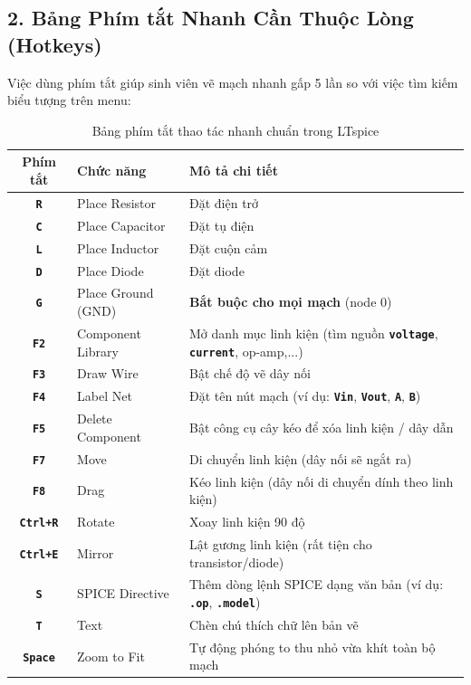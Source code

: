 \documentclass[11pt,a4paper]{article}
\newcommand{\code}[1]{\texttt{\color{navy}\textbf{#1}}}
\newcommand{\key}[1]{\colorbox{gray!20}{\texttt{\textbf{#1}}}}
\begin{document}
\subsection{2. Bảng Phím tắt Nhanh Cần Thuộc Lòng (Hotkeys)}
Việc dùng phím tắt giúp sinh viên vẽ mạch nhanh gấp 5 lần so với việc tìm kiếm biểu tượng trên menu:

\begin{table}[H]\centering\small
\caption{Bảng phím tắt thao tác nhanh chuẩn trong LTspice}\label{tab:phimtat}
\renewcommand{\arraystretch}{1.25}
\begin{tabularx}{\linewidth}{|c|p{4.8cm}|X|}\hline
\rowcolor{navy!15}\textbf{Phím tắt} & \textbf{Chức năng} & \textbf{Mô tả chi tiết} \\ \hline
\key{R} & Place Resistor & Đặt điện trở \\ \hline
\key{C} & Place Capacitor & Đặt tụ điện \\ \hline
\key{L} & Place Inductor & Đặt cuộn cảm \\ \hline
\key{D} & Place Diode & Đặt diode \\ \hline
\key{G} & Place Ground (GND) & \textbf{Bắt buộc cho mọi mạch} (node 0) \\ \hline
\key{F2} & Component Library & Mở danh mục linh kiện (tìm nguồn \code{voltage}, \code{current}, op-amp,...) \\ \hline
\key{F3} & Draw Wire & Bật chế độ vẽ dây nối \\ \hline
\key{F4} & Label Net & Đặt tên nút mạch (ví dụ: \code{Vin}, \code{Vout}, \code{A}, \code{B}) \\ \hline
\key{F5} & Delete Component & Bật công cụ cây kéo để xóa linh kiện / dây dẫn \\ \hline
\key{F7} & Move & Di chuyển linh kiện (dây nối sẽ ngắt ra) \\ \hline
\key{F8} & Drag & Kéo linh kiện (dây nối di chuyển dính theo linh kiện) \\ \hline
\key{Ctrl+R} & Rotate & Xoay linh kiện 90 độ \\ \hline
\key{Ctrl+E} & Mirror & Lật gương linh kiện (rất tiện cho transistor/diode) \\ \hline
\key{S} & SPICE Directive & Thêm dòng lệnh SPICE dạng văn bản (ví dụ: \code{.op}, \code{.model}) \\ \hline
\key{T} & Text & Chèn chú thích chữ lên bản vẽ \\ \hline
\key{Space} & Zoom to Fit & Tự động phóng to thu nhỏ vừa khít toàn bộ mạch \\ \hline
\end{tabularx}
\end{table}
\end{document}
